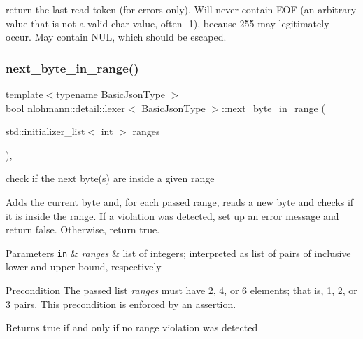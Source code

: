 return the last read token (for errors only). Will never contain E\+OF (an arbitrary value that is not a valid char value, often -\/1), because 255 may legitimately occur. May contain N\+UL, which should be escaped. \mbox{\label{classnlohmann_1_1detail_1_1lexer_a2faa544ab5475523ead81f9cdef41a0a}} 
\subsubsection{\texorpdfstring{next\+\_\+byte\+\_\+in\+\_\+range()}{next\_byte\_in\_range()}}
{\footnotesize\ttfamily template$<$typename Basic\+Json\+Type $>$ \\
bool \mbox{\hyperlink{classnlohmann_1_1detail_1_1lexer}{nlohmann\+::detail\+::lexer}}$<$ Basic\+Json\+Type $>$\+::next\+\_\+byte\+\_\+in\+\_\+range (\begin{DoxyParamCaption}\item[{std\+::initializer\+\_\+list$<$ int $>$}]{ranges }\end{DoxyParamCaption})\hspace{0.3cm}{\ttfamily [inline]}, {\ttfamily [private]}}



check if the next byte(s) are inside a given range 

Adds the current byte and, for each passed range, reads a new byte and checks if it is inside the range. If a violation was detected, set up an error message and return false. Otherwise, return true.


\begin{DoxyParams}[1]{Parameters}
\mbox{\tt in}  & {\em ranges} & list of integers; interpreted as list of pairs of inclusive lower and upper bound, respectively\\
\hline
\end{DoxyParams}
\begin{DoxyPrecond}{Precondition}
The passed list {\itshape ranges} must have 2, 4, or 6 elements; that is, 1, 2, or 3 pairs. This precondition is enforced by an assertion.
\end{DoxyPrecond}
\begin{DoxyReturn}{Returns}
true if and only if no range violation was detected 
\end{DoxyReturn}
\mbox{\label{classnlohmann_1_1detail_1_1lexer_a6f717deb553337736f27cdacccaee536}} 
